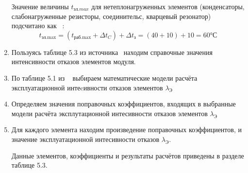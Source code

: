 \begin{enumerate}
  Значение величины $t_{эл.max}$  для нетеплонагруженных элементов
  (конденсаторы, слабонагруженные резисторы, соединительс, кварцевый резонатор)
  подсчитано как ~\cite{Borovikov2010}:
  \begin{equation}
    t_{\text{эл.max}} = (t_{\text{раб.max}} + \Delta t_C) + \Delta t_{\text{з}} = (40 + 10) +10 = 60°С
  \end{equation}
%
\item Пользуясь таблице 5.3 из источника~\cite{Borovikov2010} находим
  справочные значения интенсивности отказов элементов модуля.

\item По таблице 5.1 из ~\cite{Borovikov2010} выбираем математические
модели расчёта эксплуатационной интеcивности отказов элементов
$\lambda_{\text{Э}}$

\item Определяем значения поправочных коэффициентов, входящих в
выбранные модели расчёта эксплутационной интесивности отказов
элементов $\lambda_{\text{Э}}$
\item Для каждого элемента находим произведение поправочных
коэффициентов, и значение эксплуатационной интесивности отказов
$\lambda_{\text{Э}}$.

Данные элементов, коэффициенты и результаты расчётов приведены в
разделе таблице 5.3.


\end{enumerate}
